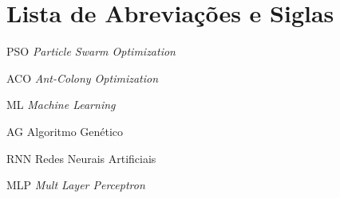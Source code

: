 \chapter*{Lista de Abreviações e Siglas}


PSO \hspace{2cm} \textit{Particle Swarm Optimization}

ACO \hspace{2cm} \textit{Ant-Colony Optimization}

ML \hspace{2cm} \textit{Machine Learning}

AG \hspace{2cm} Algoritmo Genético

RNN \hspace{2cm} Redes Neurais Artificiais

MLP \hspace{2cm} \textit{Mult Layer Perceptron}

%

